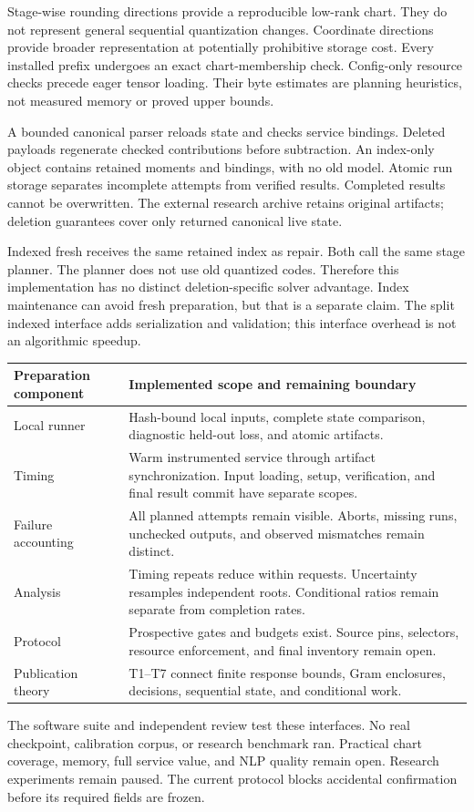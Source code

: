 Stage-wise rounding directions provide a reproducible low-rank chart. They do not represent general sequential quantization changes. Coordinate directions provide broader representation at potentially prohibitive storage cost. Every installed prefix undergoes an exact chart-membership check. Config-only resource checks precede eager tensor loading. Their byte estimates are planning heuristics, not measured memory or proved upper bounds.

 A bounded canonical parser reloads state and checks service bindings. Deleted payloads regenerate checked contributions before subtraction. An index-only object contains retained moments and bindings, with no old model. Atomic run storage separates incomplete attempts from verified results. Completed results cannot be overwritten. The external research archive retains original artifacts; deletion guarantees cover only returned canonical live state.

 Indexed fresh receives the same retained index as repair. Both call the same stage planner. The planner does not use old quantized codes. Therefore this implementation has no distinct deletion-specific solver advantage. Index maintenance can avoid fresh preparation, but that is a separate claim. The split indexed interface adds serialization and validation; this interface overhead is not an algorithmic speedup.

\begin{tabularx}{\linewidth}{@{}p{.30\linewidth}X@{}}\toprule
Preparation component & Implemented scope and remaining boundary\\\midrule
Local runner & Hash-bound local inputs, complete state comparison, diagnostic held-out loss, and atomic artifacts.\\
Timing & Warm instrumented service through artifact synchronization. Input loading, setup, verification, and final result commit have separate scopes.\\
Failure accounting & All planned attempts remain visible. Aborts, missing runs, unchecked outputs, and observed mismatches remain distinct.\\
Analysis & Timing repeats reduce within requests. Uncertainty resamples independent roots. Conditional ratios remain separate from completion rates.\\
Protocol & Prospective gates and budgets exist. Source pins, selectors, resource enforcement, and final inventory remain open.\\
Publication theory & T1--T7 connect finite response bounds, Gram enclosures, decisions, sequential state, and conditional work.\\\bottomrule
\end{tabularx}

The software suite and independent review test these interfaces. No real checkpoint, calibration corpus, or research benchmark ran. Practical chart coverage, memory, full service value, and NLP quality remain open. Research experiments remain paused. The current protocol blocks accidental confirmation before its required fields are frozen.
